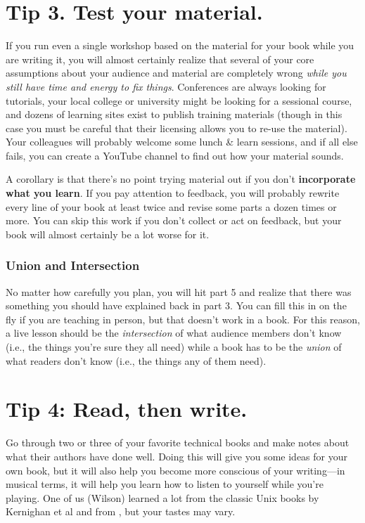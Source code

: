 \documentclass[10pt,letterpaper]{article}
\begin{document}
\section*{Tip 3. Test your material.}

If you run even a single workshop based on the material for your book
while you are writing it,
you will almost certainly realize that
several of your core assumptions about your audience and material are completely wrong
\emph{while you still have time and energy to fix things}.
Conferences are always looking for tutorials,
your local college or university might be looking for a sessional course,
and dozens of learning sites exist to publish training materials
(though in this case you must be careful that
their licensing allows you to re-use the material).
Your colleagues will probably welcome some lunch \& learn sessions,
and if all else fails,
you can create a YouTube channel to find out how your material sounds.

A corollary is that
there's no point trying material out if you don't \textbf{incorporate what you learn}.
If you pay attention to feedback,
you will probably rewrite every line of your book at least twice
and revise some parts a dozen times or more.
You can skip this work if you don't collect or act on feedback,
but your book will almost certainly be a lot worse for it.

\subsubsection*{Union and Intersection}

No matter how carefully you plan,
you will hit part 5 and realize that
there was something you should have explained back in part 3.
You can fill this in on the fly if you are teaching in person,
but that doesn't work in a book.
For this reason,
a live lesson should be the \emph{intersection} of what audience members don't know
(i.e., the things you're sure they all need)
while a book has to be the \emph{union} of what readers don't know
(i.e., the things any of them need).

\section*{Tip 4: Read, then write.}

Go through two or three of your favorite technical books
and make notes about what their authors have done well.
Doing this will give you some ideas for your own book,
but it will also help you become more conscious of your writing—in musical terms,
it will help you learn how to listen to yourself while you're playing.
One of us (Wilson) learned a lot from the classic Unix books by Kernighan et al
\cite{Ke1979,Ke1981,Ke1983,Ke1988} and from \cite{Ud1999},
but your tastes may vary.
\end{document}
